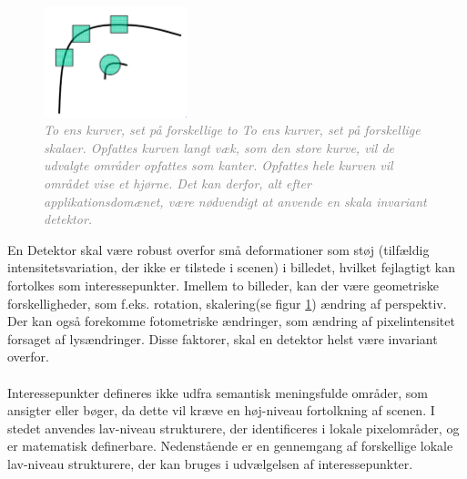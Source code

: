 \begin{figure}[H]
    \centering
    \includegraphics[width=0.37\textwidth]{fig/28.png}
     \vspace{-1em}
    \begin{center}    
       \caption{\textcolor{gray}{\footnotesize \textit{To ens kurver, set på forskellige to To ens kurver, set på forskellige skalaer. Opfattes kurven langt væk, som den store kurve, vil de udvalgte områder opfattes som kanter. Opfattes hele kurven vil området vise et hjørne. Det kan derfor, alt efter applikationsdomænet, være nødvendigt at anvende en skala invariant detektor.}}}
    \label{fig:skal}
     \end{center}
     \vspace{-2.5em}
  \end{figure} \noindent
En Detektor skal være robust overfor små deformationer som støj (tilfældig intensitetsvariation, der ikke er tilstede i scenen) i billedet, hvilket fejlagtigt kan fortolkes som interessepunkter. Imellem to billeder, kan der være geometriske forskelligheder, som f.eks. rotation, skalering(se figur  \ref{fig:skal}) ændring af perspektiv. Der kan også forekomme fotometriske ændringer, som ændring af pixelintensitet forsaget af lysændringer. Disse faktorer, skal en detektor helst være invariant overfor.  
\\
\\
Interessepunkter defineres ikke udfra semantisk meningsfulde områder, som ansigter eller bøger, da dette vil kræve en høj-niveau fortolkning af scenen. I stedet anvendes lav-niveau strukturere, der identificeres i lokale pixelområder, og er matematisk definerbare. Nedenstående er en gennemgang af forskellige lokale lav-niveau strukturere, der kan bruges i udvælgelsen af interessepunkter.


